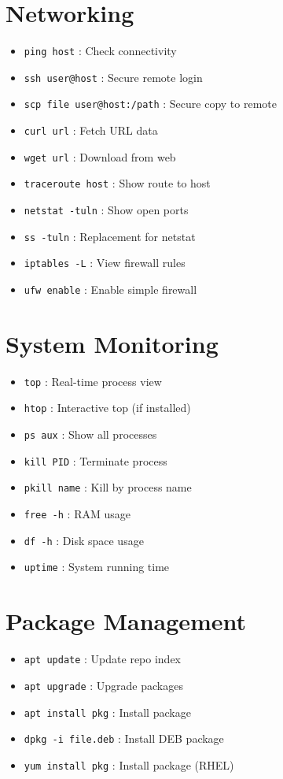 \documentclass[12pt]{article}
\begin{document}
\begin{multicols}{2}
\section*{Networking}
\begin{itemize}[leftmargin=0.5cm]
  \item \texttt{ping host} : Check connectivity
  \item \texttt{ssh user@host} : Secure remote login
  \item \texttt{scp file user@host:/path} : Secure copy to remote
  \item \texttt{curl url} : Fetch URL data
  \item \texttt{wget url} : Download from web
  \item \texttt{traceroute host} : Show route to host
  \item \texttt{netstat -tuln} : Show open ports
  \item \texttt{ss -tuln} : Replacement for netstat
  \item \texttt{iptables -L} : View firewall rules
  \item \texttt{ufw enable} : Enable simple firewall
\end{itemize}

\section*{System Monitoring}
\begin{itemize}[leftmargin=0.5cm]
  \item \texttt{top} : Real-time process view
  \item \texttt{htop} : Interactive top (if installed)
  \item \texttt{ps aux} : Show all processes
  \item \texttt{kill PID} : Terminate process
  \item \texttt{pkill name} : Kill by process name
  \item \texttt{free -h} : RAM usage
  \item \texttt{df -h} : Disk space usage
  \item \texttt{uptime} : System running time
\end{itemize}

\section*{Package Management}
\begin{itemize}[leftmargin=0.5cm]
  \item \texttt{apt update} : Update repo index
  \item \texttt{apt upgrade} : Upgrade packages
  \item \texttt{apt install pkg} : Install package
  \item \texttt{dpkg -i file.deb} : Install DEB package
  \item \texttt{yum install pkg} : Install package (RHEL)
\end{itemize}


\end{multicols}
\end{document}
